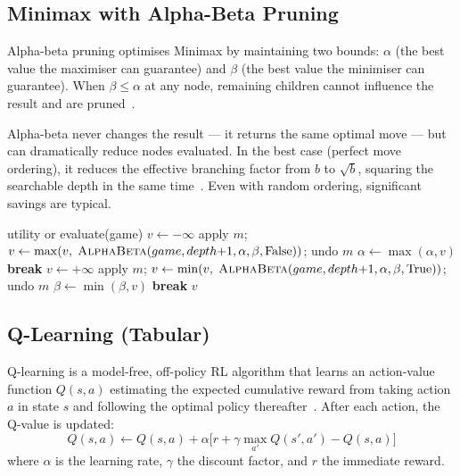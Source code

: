 \documentclass[12pt, a4paper]{article}
\begin{document}
\subsection{Minimax with Alpha-Beta Pruning}

Alpha-beta pruning optimises Minimax by maintaining two bounds: $\alpha$ (the best value the
maximiser can guarantee) and $\beta$ (the best value the minimiser can guarantee). When
$\beta \leq \alpha$ at any node, remaining children cannot influence the result and are
pruned~\cite{knuth1975,russell2010}.

Alpha-beta never changes the result — it returns the same optimal move — but can dramatically
reduce nodes evaluated. In the best case (perfect move ordering), it reduces the effective
branching factor from $b$ to $\sqrt{b}$, squaring the searchable depth in the same
time~\cite{knuth1975}. Even with random ordering, significant savings are typical.

\begin{algorithm}[H]
\caption{Minimax with Alpha-Beta Pruning}
\begin{algorithmic}[1]
        \State \Return utility or evaluate(game)
    \EndIf
        \State $v \leftarrow -\infty$
            \State apply $m$; \;
            $v \leftarrow \max(v,\;\Call{AlphaBeta}{game, depth{+}1, \alpha, \beta, \text{False}})$;
            \; undo $m$
            \State $\alpha \leftarrow \max(\alpha, v)$
            \If{$\beta \leq \alpha$} \textbf{break} \EndIf
        \EndFor
    \Else
        \State $v \leftarrow +\infty$
            \State apply $m$; \;
            $v \leftarrow \min(v,\;\Call{AlphaBeta}{game, depth{+}1, \alpha, \beta, \text{True}})$;
            \; undo $m$
            \State $\beta \leftarrow \min(\beta, v)$
            \If{$\beta \leq \alpha$} \textbf{break} \EndIf
        \EndFor
    \EndIf
    \State \Return $v$
\EndFunction
\end{algorithmic}
\end{algorithm}


\subsection{Q-Learning (Tabular)}

Q-learning is a model-free, off-policy RL algorithm that learns an action-value function
$Q(s, a)$ estimating the expected cumulative reward from taking action $a$ in state $s$ and
following the optimal policy thereafter~\cite{watkins1992,sutton2018}. After each action, the
Q-value is updated:
\begin{equation}
    Q(s, a) \leftarrow Q(s, a) + \alpha \bigl[ r + \gamma \max_{a'} Q(s', a') - Q(s, a) \bigr]
\end{equation}
where $\alpha$ is the learning rate, $\gamma$ the discount factor, and $r$ the immediate reward.
\end{document}

